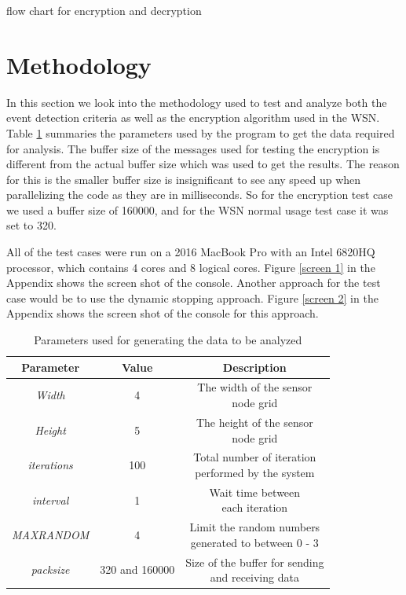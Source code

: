 \documentclass[conference]{IEEEtran}
\begin{document}
	


	
	flow chart for encryption and decryption
	

	\section{Methodology}\label{method}

	In this section we look into the methodology used to test and analyze both the event detection criteria as well as the encryption algorithm used in the WSN. Table \ref{params} summaries the parameters used by the program to get the data required for analysis. The buffer size of the messages used for testing the encryption is different from the actual buffer size which was used to get the results. The reason for this is the smaller buffer size is insignificant to see any speed up when parallelizing the code as they are in milliseconds. So for the encryption test case we used a buffer size of 160000, and for the WSN normal usage test case it was set to 320. 
	
	All of the test cases were run on a 2016 MacBook Pro with an Intel 6820HQ processor, which contains 4 cores and 8 logical cores. Figure \ref{screen 1} in the Appendix shows the screen shot of the console. Another approach for the test case would be to use the dynamic stopping approach. Figure \ref{screen 2} in the Appendix shows the screen shot of the console for this approach.
		
	\begin{table}[!h]\caption{Parameters used for generating the data to be analyzed}
		\begin{center}
			\renewcommand{\arraystretch}{1.2}
			\begin{tabular}{| c | c | c |} 
				\hline
				\textbf{Parameter} & \textbf{Value} & \textbf{Description} \\ \hline
				\emph{Width}    &  4   & \makecell{The width of the sensor \\ node grid }   \\ \hline
				\emph{Height}    &  5   & \makecell{The height of the sensor \\ node grid }   \\ \hline
				\emph{iterations}    &  100   & \makecell{Total number of iteration \\ performed by the system }   \\ \hline
				\emph{interval}    &  1   & \makecell{Wait time between \\ each iteration }   \\ \hline
				\emph{MAXRANDOM}    &  4   & \makecell{Limit the random numbers \\ generated to between 0 - 3 }   \\ \hline
				\emph{packsize}    &  320 and 160000   & \makecell{Size of the buffer for sending\\ and receiving data }   \\ \hline
			\end{tabular}
			\label{params}
		\end{center}
	\end{table}
\end{document}
